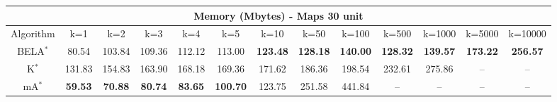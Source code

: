 \begin{tabular}{c|cccccccccccc}\toprule
\multicolumn{13}{c}{Memory (Mbytes) - Maps 30 unit}\\ \midrule
Algorithm & k=1 & k=2 & k=3 & k=4 & k=5 & k=10 & k=50 & k=100 & k=500 & k=1000 & k=5000 & k=10000 \\ \midrule
BELA$^*$ & 80.54 & 103.84 & 109.36 & 112.12 & 113.00 & \textbf{123.48} & \textbf{128.18} & \textbf{140.00} & \textbf{128.32} & \textbf{139.57} & \textbf{173.22} & \textbf{256.57} \\
K$^*$ & 131.83 & 154.83 & 163.90 & 168.18 & 169.36 & 171.62 & 186.36 & 198.54 & 232.61 & 275.86 & -- & -- \\
mA$^*$ & \textbf{59.53} & \textbf{70.88} & \textbf{80.74} & \textbf{83.65} & \textbf{100.70} & 123.75 & 251.58 & 441.84 & -- & -- & -- & -- \\ \bottomrule 
\end{tabular}
